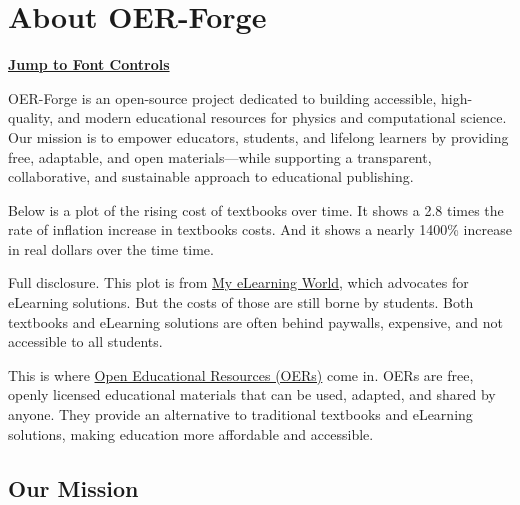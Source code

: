\section{About OER-Forge}\label{about-oer-forge}

\hyperref[font-controls]{\textbf{Jump to Font Controls}}

OER-Forge is an open-source project dedicated to building accessible,
high-quality, and modern educational resources for physics and
computational science. Our mission is to empower educators, students,
and lifelong learners by providing free, adaptable, and open
materials---while supporting a transparent, collaborative, and
sustainable approach to educational publishing.

Below is a plot of the rising cost of textbooks over time. It shows a
2.8 times the rate of inflation increase in textbooks costs. And it
shows a nearly 1400\% increase in real dollars over the time time.

Full disclosure. This plot is from
\href{https://myelearningworld.com/textbook-prices-vs-inflation/}{My
eLearning World}, which advocates for eLearning solutions. But the costs
of those are still borne by students. Both textbooks and eLearning
solutions are often behind paywalls, expensive, and not accessible to
all students.

This is where
\href{https://en.wikipedia.org/wiki/Open_educational_resources}{Open
Educational Resources (OERs)} come in. OERs are free, openly licensed
educational materials that can be used, adapted, and shared by anyone.
They provide an alternative to traditional textbooks and eLearning
solutions, making education more affordable and accessible.

\subsection{Our Mission}\label{our-mission}

